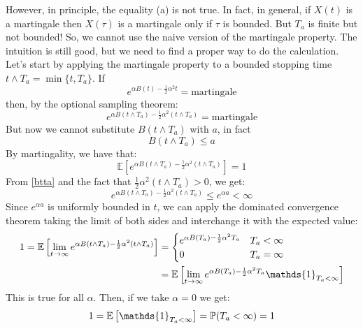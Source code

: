However, in principle, the equality (a) is not true. In fact, in general, if $X(t)$ is a martingale then $X(\tau)$ is a martingale only if $\tau$ is bounded. But $T_a$ is finite but not bounded! So, we cannot use the naive version of the martingale property. The intuition is still good, but we need to find a proper way to do the calculation. \\
Let's start by applying the martingale property to a bounded stopping time $t\wedge T_a=\min\{t,T_a\}$. If
\begin{equation}
    e^{\alpha B(t)-\frac{1}{2}\alpha^2 t} = \text{martingale}
\end{equation}
then, by the optional sampling theorem:
\begin{equation}
    e^{\alpha B(t\wedge T_a)-\frac{1}{2}\alpha^2 (t\wedge T_a)} = \text{martingale}
\end{equation}
But now we cannot substitute $B(t\wedge T_a)$ with $a$, in fact
\begin{equation}\label{btta}
    B(t\wedge T_a) \le a
\end{equation}
By martingality, we have that:
\begin{equation}
    \mathbb{E}\left[e^{\alpha B(t\wedge T_a)-\frac{1}{2}\alpha^2 (t\wedge T_a)}\right] = 1
\end{equation}
From \eqref{btta} and the fact that $\frac{1}{2}\alpha^2 (t\wedge T_a) > 0$, we get:
\begin{equation}
    e^{\alpha B(t\wedge T_a)-\frac{1}{2}\alpha^2 (t\wedge T_a)} \le e^{\alpha a} < \infty
\end{equation}
Since $e^{\alpha a}$ is uniformly bounded in $t$, we can apply the dominated convergence theorem taking the limit of both sides and interchange it with the expected value:
\begin{align}
    \notag 1 = \mathbb{E}\left[\lim_{t\to\infty}e^{\alpha B(t\wedge T_a)-\frac{1}{2}\alpha^2 (t\wedge T_a)}\right] &=
    \begin{cases}
    e^{\alpha B(T_a)-\frac{1}{2}\alpha^2 T_a} & T_a<\infty \\
    0 & T_a = \infty
    \end{cases}\\
    &=
    \mathbb{E}\left[\lim_{t\to\infty}e^{\alpha B(T_a)-\frac{1}{2}\alpha^2 T_a}\mathds{1}_{T_a<\infty}\right]
\end{align}
This is true for all $\alpha$. Then, if we take $\alpha = 0$ we get:
\begin{equation}
    1 = \mathbb{E}\left[\mathds{1}_{T_a<\infty} \right] = \Pmeas(T_a<\infty) = 1
\end{equation}
